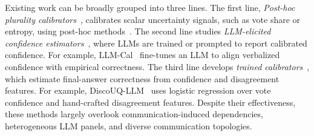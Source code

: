 Existing work can be broadly grouped into three lines. The first line, \textit{Post-hoc plurality calibrators}~\cite{zhang2026agentic}, calibrates scalar uncertainty signals, such as vote share or entropy, using post-hoc methods~\cite{platt1999probabilistic,zadrozny2002transforming,kumar2019verified}.
The second line studies \textit{LLM-elicited confidence estimators}~\cite{lin2022teaching,yang2024confidence}, where LLMs are trained or prompted to report calibrated confidence. For example, LLM-Cal~\cite{lin2022teaching} fine-tunes an LLM to align verbalized confidence with empirical correctness. 
The third line develops \textit{trained calibrators}~\cite{li2025graph,jiang2026discouq,zhu2026demystifying}, which estimate final-answer correctness from confidence and disagreement features. For example, DiscoUQ-LLM~\cite{jiang2026discouq} uses logistic regression over vote confidence and hand-crafted disagreement features. 
Despite their effectiveness, these methods largely overlook communication-induced dependencies, heterogeneous LLM panels, and diverse communication topologies.





